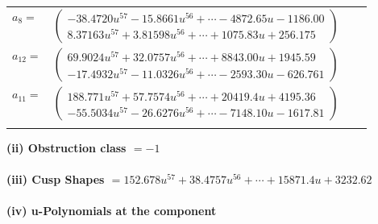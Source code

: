\documentclass[1p]{elsarticle_modified}
\theoremstyle{definition}
\begin{document}
\begin{tabular}{m{7pt} m{180pt} m{7pt} m{180pt} }
\flushright $a_{8}=$&$\begin{pmatrix}-38.4720 u^{57}-15.8661 u^{56}+\cdots-4872.65 u-1186.00\\8.37163 u^{57}+3.81598 u^{56}+\cdots+1075.83 u+256.175\end{pmatrix}$ \\
\flushright $a_{12}=$&$\begin{pmatrix}69.9024 u^{57}+32.0757 u^{56}+\cdots+8843.00 u+1945.59\\-17.4932 u^{57}-11.0326 u^{56}+\cdots-2593.30 u-626.761\end{pmatrix}$ \\
\flushright $a_{11}=$&$\begin{pmatrix}188.771 u^{57}+57.7574 u^{56}+\cdots+20419.4 u+4195.36\\-55.5034 u^{57}-26.6276 u^{56}+\cdots-7148.10 u-1617.81\end{pmatrix}$\\&\end{tabular}
\flushleft \textbf{(ii) Obstruction class $= -1$}\\~\\
\flushleft \textbf{(iii) Cusp Shapes $= 152.678 u^{57}+38.4757 u^{56}+\cdots+15871.4 u+3232.62$}\\~\\
\newpage\renewcommand{\arraystretch}{1}
\flushleft \textbf{(iv) u-Polynomials at the component}\newline \\
\end{document}
